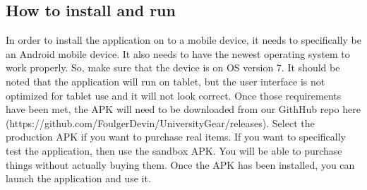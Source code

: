 \documentclass[journal,compsoc, 10pt, draftclsnofoot, onecolumn]{IEEEtran}
\begin{document}
\subsection{How to install and run}
In order to install the application on to a mobile device, it needs to specifically 
be an Android mobile device. It also needs to have the newest operating system 
to work properly. So, make sure that the device is on OS version 7. It should be 
noted that the application will run on tablet, but the user interface is not optimized 
for tablet use and it will not look correct. Once those requirements have been met, 
the APK will need to be downloaded from our GithHub repo here (https://github.com/FoulgerDevin/UniversityGear/releases).
Select the production APK if you want to purchase real items. If you want to 
specifically test the application, then use the sandbox APK. You will be able to 
purchase things without actually buying them. Once the APK has been installed, 
you can launch the application and use it. 
\end{document}
